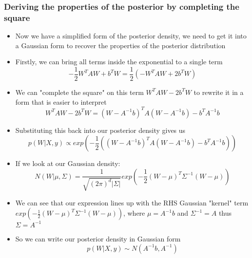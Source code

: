 \documentclass[12pt]{article}
\begin{document}
\subsubsection{Deriving the properties of the posterior by completing the square}
\begin{itemize}
     \item Now we have a simplified form of the posterior density, we need to get it into a Gaussian form to recover the properties of the posterior distribution
    \item Firstly, we can bring all terms inside the exponential to a single term
\begin{equation}
    -\frac{1}{2}W^TAW + b^TW = \frac{1}{2}\left(-W^TAW + 2b^TW\right)
\end{equation}
    \item We can "complete the square" on this term $W^TAW - 2b^TW$ to rewrite it in a form that is easier to interpret
\begin{equation}
    W^TAW - 2b^TW = (W - A^{-1}b)^TA(W - A^{-1}b) - b^TA^{-1}b
\end{equation}
    \item Substituting this back into our posterior density gives us
\begin{equation}
    p(W|X,y) \propto exp\left(-\frac{1}{2}\left((W - A^{-1}b)^TA(W - A^{-1}b) - b^TA^{-1}b\right)\right)
\end{equation}
    \item If we look at our Gaussian density: 
\begin{equation}
    N(W | \mu, \Sigma) = \frac{1}{\sqrt{(2\pi)^d |\Sigma|}} exp\left(-\frac{1}{2}(W - \mu)^T\Sigma^{-1}(W - \mu)\right)
\end{equation}
    \item We can see that our expression lines up with the RHS Gaussian "kernel" term $exp\left(-\frac{1}{2}(W - \mu)^T\Sigma^{-1}(W - \mu)\right)$, where $\mu = A^{-1}b$ and $\Sigma^{-1} = A$ thus $\Sigma = A^{-1}$
    \item So we can write our posterior density in Gaussian form
\begin{equation}
    p(W|X,y) \sim N(A^{-1}b, A^{-1})
\end{equation}
\end{itemize}
\end{document}
